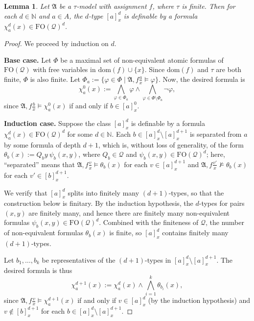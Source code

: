 \documentclass{article}
\newtheorem{lemma}[theorem]{Lemma}
\theoremstyle{definition}
\begin{document}
\begin{lemma}\label{lem:X-definable}
    Let $\mathfrak{A}$ be a $\tau$-model with assignment $f$, where $\tau$ is finite. Then for each $d\in\mathbb{N}$ and $a\in A$, the $d$-type $[a]^d_x$ is definable by a formula $\chi^d_a(x)\in\mathrm{FO}(\mathcal{Q})^d$.
\end{lemma}
\begin{proof}

    We proceed by induction on $d$.

    \textbf{Base case.} Let $\Phi$ be a maximal set of non-equivalent atomic formulas of $\mathrm{FO}(\mathcal{Q})$ with free variables in $\text{dom}(f)\cup\{x\}$. Since $\text{dom}(f)$ and $\tau$ are both finite, $\Phi$ is also finite. Let $\Phi_a:=\{\varphi\in \Phi \mid \mathfrak{A},f\frac{a}{x}\models \varphi\}$. Now, the desired formula is
    \[
        \chi^0_a(x):=\bigwedge_{\varphi\in \Phi_a} \varphi \land \bigwedge_{\varphi \in \Phi\setminus\Phi_a}\neg \varphi,
    \]
    since $\mathfrak{A},f\frac{b}{x}\models\chi^0_a(x)$ if and only if $b\in[a]^0_x$.

    \textbf{Induction case.} Suppose the class $[a]^d_x$ is definable by a formula $\chi^d_a(x)\in\mathrm{FO}(\mathcal{Q})^d$ for some $d\in \mathbb{N}$. Each $b\in[a]^d_x\setminus [a]^{d+1}_x$ is separated from $a$ by some formula of depth $d+1$, which is, without loss of generality, of the form $\theta_b(x):=Q_b y\ \psi_b(x,y)$, where $Q_b \in \mathcal{Q}$ and $\psi_b(x,y)\in\mathrm{FO}(\mathcal{Q})^d$; here, ``separated'' means that $\mathfrak{A},f\frac{v}{x}\models\theta_b(x)$ for each $v \in [a]^{d+1}_x$ and $\mathfrak{A},f\frac{v'}{x}\not\models\theta_b(x)$ for each $v' \in [b]^{d+1}_x$.

    We verify that $[a]^d_x$ splits into finitely many $(d+1)$-types, so that the construction below is finitary. By the induction hypothesis, the $d$-types for pairs $(x,y)$ are finitely many, and hence there are finitely many non-equivalent formulas $\psi_b(x,y)\in\mathrm{FO}(\mathcal{Q})^d$. Combined with the finiteness of $\mathcal{Q}$, the number of non-equivalent formulas $\theta_b(x)$ is finite, so $[a]^d_x$ contains finitely many $(d+1)$-types.
    
    Let $b_1,\dots,b_k$ be representatives of the $(d+1)$-types in $[a]^d_x\setminus [a]^{d+1}_x$. The desired formula is thus
    \[
        \chi^{d+1}_a(x):=\chi^d_a(x)\land \bigwedge_{i=1}^k\theta_{b_i}(x),
    \]
    since $\mathfrak{A},f\frac{v}{x}\models \chi^{d+1}_a(x)$ if and only if $v \in [a]^d_x$ (by the induction hypothesis) and $v\notin [b]^{d+1}_x$ for each $b\in [a]^d_x\setminus [a]^{d+1}_x$.
\end{proof}
\end{document}
